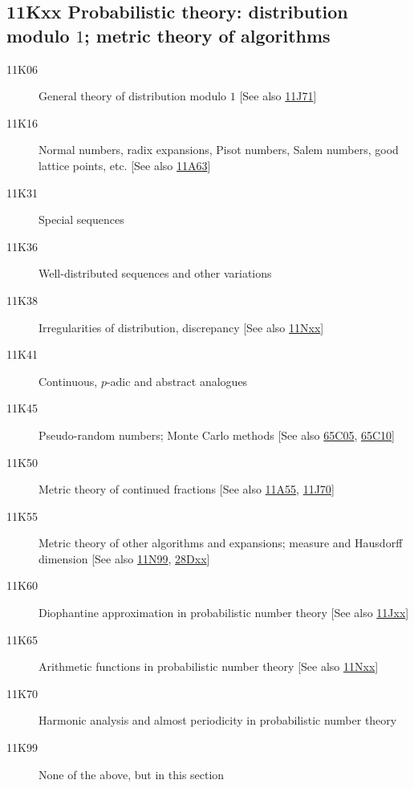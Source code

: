 \documentclass[letterpaper]{article}
\begin{document}
\subsection*{11Kxx  Probabilistic theory: distribution modulo $1$; metric theory of algorithms }\label{11Kxx}
\begin{description}  
\item [11K06]\label{11K06} General theory of distribution modulo $1$ [See also \hyperref[11J71]{11J71}]
\item [11K16]\label{11K16} Normal numbers, radix expansions, Pisot numbers, Salem numbers, good lattice points, etc. [See also \hyperref[11A63]{11A63}]
\item [11K31]\label{11K31} Special sequences
\item [11K36]\label{11K36} Well-distributed sequences and other variations
\item [11K38]\label{11K38} Irregularities of distribution, discrepancy [See also \hyperref[11Nxx]{11Nxx}]
\item [11K41]\label{11K41} Continuous, $p$-adic and abstract analogues
\item [11K45]\label{11K45} Pseudo-random numbers; Monte Carlo methods [See also \hyperref[65C05]{65C05}, \hyperref[65C10]{65C10}]
\item [11K50]\label{11K50} Metric theory of continued fractions [See also \hyperref[11A55]{11A55}, \hyperref[11J70]{11J70}]
\item [11K55]\label{11K55} Metric theory of other algorithms and expansions; measure and Hausdorff dimension [See also \hyperref[11N99]{11N99}, \hyperref[28Dxx]{28Dxx}]
\item [11K60]\label{11K60} Diophantine approximation in probabilistic number theory [See also \hyperref[11Jxx]{11Jxx}]
\item [11K65]\label{11K65} Arithmetic functions in probabilistic number theory [See also \hyperref[11Nxx]{11Nxx}]
\item [11K70]\label{11K70} Harmonic analysis and almost periodicity in probabilistic number theory
\item [11K99]\label{11K99} None of the above, but in this section
\end{description}
\end{document}
